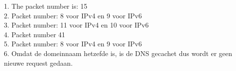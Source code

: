 1. The packet number is: 15\\

2. Packet number: 8 voor IPv4 en 9 voor IPv6\\

3. Packet number: 11 voor IPv4 en 10 voor IPv6\\

4. Packet number 41\\

5. Packet number: 8 voor IPv4 en 9 voor IPv6\\

6. Omdat de domeinnaam hetzefde is, is de DNS gecachet dus wordt er geen nieuwe request gedaan. 